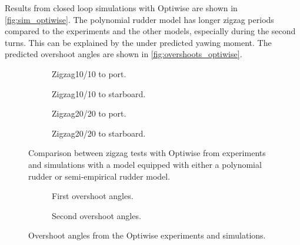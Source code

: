 Results from closed loop simulations with Optiwise are shown in \autoref{fig:sim_optiwise}. The polynomial rudder model has longer zigzag periods compared to the experiments and the other models, especially during the second turns. This can be explained by the under predicted yawing moment. The predicted overshoot angles are shown in \autoref{fig:overshoots_optiwise}.   
\begin{figure}[h]
     \centering
     \begin{subfigure}[b]{0.40\textwidth}
         \centering
         
        \caption{Zigzag10/10 to port.}
        \label{fig:sim_optiwise_10_port}
     \end{subfigure}
     \hfill
     \begin{subfigure}[b]{0.40\textwidth}
         
        \caption{Zigzag10/10 to starboard.}
        \label{fig:sim_optiwise_10_stbd}
     \end{subfigure}
     \vfill
     \begin{subfigure}[b]{0.40\textwidth}
         \centering
         
        \caption{Zigzag20/20 to port.}
        \label{fig:sim_optiwise_20_port}
     \end{subfigure}
     \hfill
     \begin{subfigure}[b]{0.40\textwidth}
         
        \caption{Zigzag20/20 to starboard.}
        \label{fig:sim_optiwise_20_stbd}
     \end{subfigure}
     
        \caption{Comparison between zigzag tests with Optiwise from experiments and simulations with a model equipped with either a polynomial rudder or semi-empirical rudder model.}
        \label{fig:sim_optiwise}
\end{figure}
\begin{figure}[h]
     \centering
     \begin{subfigure}[b]{\textwidth}
         \centering
         
        \caption{First overshoot angles.}
        \label{fig:overhoots1_optiwise}
     \end{subfigure}
     \vfill
     \begin{subfigure}[b]{\textwidth}
         \centering
         
        \caption{Second overshoot angles.}
        \label{fig:overhoots2_optiwise}
     \end{subfigure}
     
        \caption{Overshoot angles from the Optiwise experiments and simulations.}
        \label{fig:overshoots_optiwise}
\end{figure}